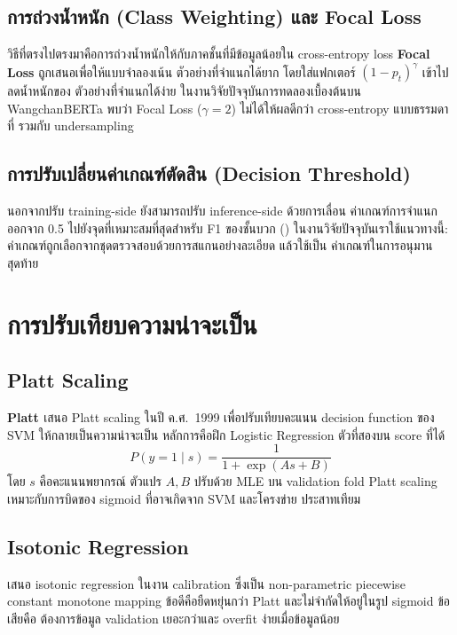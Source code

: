 \subsection{การถ่วงน้ำหนัก (Class Weighting) และ Focal Loss}

วิธีที่ตรงไปตรงมาคือการถ่วงน้ำหนักให้กับภาคชั้นที่มีข้อมูลน้อยใน cross-entropy
loss \textbf{Focal Loss} \cite{lin2017focal} ถูกเสนอเพื่อให้แบบจำลองเน้น
ตัวอย่างที่จำแนกได้ยาก โดยใส่แฟกเตอร์ $(1-p_t)^\gamma$ เข้าไปลดน้ำหนักของ
ตัวอย่างที่จำแนกได้ง่าย ในงานวิจัยปัจจุบันการทดลองเบื้องต้นบน WangchanBERTa
พบว่า Focal Loss ($\gamma=2$) ไม่ได้ให้ผลดีกว่า cross-entropy แบบธรรมดาที่
รวมกับ undersampling

\subsection{การปรับเปลี่ยนค่าเกณฑ์ตัดสิน (Decision Threshold)}

นอกจากปรับ training-side ยังสามารถปรับ inference-side ด้วยการเลื่อน
ค่าเกณฑ์การจำแนกออกจาก 0.5 ไปยังจุดที่เหมาะสมที่สุดสำหรับ F1 ของชั้นบวก
(\textcite{he2008imbalanced}) ในงานวิจัยปัจจุบันเราใช้แนวทางนี้:
ค่าเกณฑ์ถูกเลือกจากชุดตรวจสอบด้วยการสแกนอย่างละเอียด แล้วใช้เป็น
ค่าเกณฑ์ในการอนุมานสุดท้าย

\section{การปรับเทียบความน่าจะเป็น}
\label{sec:lit-calibration}

\subsection{Platt Scaling}

\textbf{Platt \cite{platt1999platt}} เสนอ Platt scaling ในปี ค.ศ.\ 1999
เพื่อปรับเทียบคะแนน decision function ของ SVM ให้กลายเป็นความน่าจะเป็น
หลักการคือฝึก Logistic Regression ตัวที่สองบน score ที่ได้
\begin{equation}
P(y=1\mid s) = \frac{1}{1 + \exp(As + B)}
\label{eq:platt}
\end{equation}
โดย $s$ คือคะแนนพยากรณ์ ตัวแปร $A, B$ ปรับด้วย MLE บน validation fold
Platt scaling เหมาะกับการบิดของ sigmoid ที่อาจเกิดจาก SVM และโครงข่าย
ประสาทเทียม

\subsection{Isotonic Regression}

\textbf{\textcite{zadrozny2002isotonic}} เสนอ isotonic regression
ในงาน calibration ซึ่งเป็น non-parametric piecewise constant monotone
mapping ข้อดีคือยืดหยุ่นกว่า Platt และไม่จำกัดให้อยู่ในรูป sigmoid ข้อเสียคือ
ต้องการข้อมูล validation เยอะกว่าและ overfit ง่ายเมื่อข้อมูลน้อย

